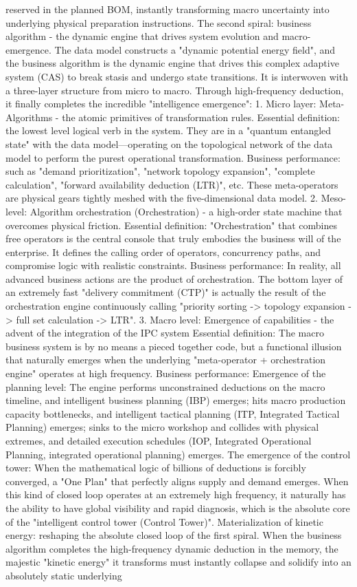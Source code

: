 \documentclass[11pt,a4paper]{article}
\begin{document}
reserved in the planned BOM, instantly transforming macro uncertainty into underlying physical preparation instructions. The second spiral: business algorithm - the dynamic engine that drives system evolution and macro-emergence. The data model constructs a "dynamic potential energy field", and the business algorithm is the dynamic engine that drives this complex adaptive system (CAS) to break stasis and undergo state transitions. It is interwoven with a three-layer structure from micro to macro. Through high-frequency deduction, it finally completes the incredible "intelligence emergence": 1. Micro layer: Meta-Algorithms - the atomic primitives of transformation rules. Essential definition: the lowest level logical verb in the system. They are in a "quantum entangled state" with the data model—operating on the topological network of the data model to perform the purest operational transformation. Business performance: such as "demand prioritization", "network topology expansion", "complete calculation", "forward availability deduction (LTR)", etc. These meta-operators are physical gears tightly meshed with the five-dimensional data model. 2. Meso-level: Algorithm orchestration (Orchestration) - a high-order state machine that overcomes physical friction. Essential definition: "Orchestration" that combines free operators is the central console that truly embodies the business will of the enterprise. It defines the calling order of operators, concurrency paths, and compromise logic with realistic constraints. Business performance: In reality, all advanced business actions are the product of orchestration. The bottom layer of an extremely fast "delivery commitment (CTP)" is actually the result of the orchestration engine continuously calling "priority sorting -> topology expansion -> full set calculation -> LTR". 3. Macro level: Emergence of capabilities - the advent of the integration of the IPC system Essential definition: The macro business system is by no means a pieced together code, but a functional illusion that naturally emerges when the underlying "meta-operator + orchestration engine" operates at high frequency. Business performance: Emergence of the planning level: The engine performs unconstrained deductions on the macro timeline, and intelligent business planning (IBP) emerges; hits macro production capacity bottlenecks, and intelligent tactical planning (ITP, Integrated Tactical Planning) emerges; sinks to the micro workshop and collides with physical extremes, and detailed execution schedules (IOP, Integrated Operational Planning, integrated operational planning) emerges. The emergence of the control tower: When the mathematical logic of billions of deductions is forcibly converged, a "One Plan" that perfectly aligns supply and demand emerges. When this kind of closed loop operates at an extremely high frequency, it naturally has the ability to have global visibility and rapid diagnosis, which is the absolute core of the "intelligent control tower (Control Tower)". Materialization of kinetic energy: reshaping the absolute closed loop of the first spiral. When the business algorithm completes the high-frequency dynamic deduction in the memory, the majestic "kinetic energy" it transforms must instantly collapse and solidify into an absolutely static underlying 
\end{document}
